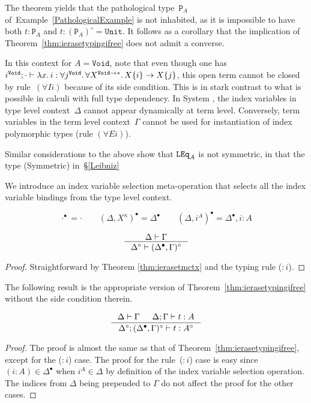 \begin{example}\label{PathologicalExampleContinued}
The theorem yields that the pathological type~$\mathtt P_A$
of~Example~\ref{PathologicalExample} is not inhabited, as it is impossible
to have both $t:\mathtt P_A$ and $t:(\mathtt P_A)^\circ=\mathtt{Unit}$.
It follows as a corollary that the implication of
Theorem~\ref{thm:ierasetypingifree} does not admit a converse.

In this context for $A=\mathtt{Void}$, note that even though one has
$i^\mathtt{Void};\cdot\vdash\lambda x.\,i:\forall
j^{\mathtt{Void}}.\,\forall X^{\mathtt{Void}\to*}.\, X\{i\}\to X\{j\}$, 
this open term %
cannot be closed by rule~$(\forall Ii)$ because of its side
condition.  This is in stark contrast to what is possible in calculi with
full type dependency. In System \Fi, the index variables
in type level context~$\Delta$ cannot appear dynamically at term level.
Conversely, term variables in the term level context~$\Gamma$ cannot be
used for instantiation of index polymorphic types (rule $(\forall Ei)$).

Similar considerations to the above show that $\mathtt{LEq}_A$ is not symmetric,
in that the type {\small\rm(Symmetric)} in~\S\ref{Leibniz}
\end{example}

We introduce an index variable selection meta-operation that selects all
the index variable bindings from the type level context.

\begin{definition}
\[ \cdot^\bullet = \cdot \qquad
	(\Delta,X^\kappa)^\bullet = \Delta^\bullet \qquad
	(\Delta,i^A)^\bullet = \Delta^\bullet,i:A
\]
\end{definition}

\begin{theorem}
\label{thm:ierasetmctxivs}
\[ \inference{\Delta |- \Gamma}{\Delta^\circ |- (\Delta^\bullet,\Gamma)^\circ}
\]
\end{theorem}
\begin{proof}
Straightforward by Theorem \ref{thm:ierasetmctx} and the typing rule ($:i$).
\end{proof}

The following result is the appropriate version of
Theorem~\ref{thm:ierasetypingifree} without the side condition therein.

\begin{theorem}
\label{thm:ierasetypingall}
\[ \inference{\Delta |- \Gamma & \Delta;\Gamma |- t : A}
		{\Delta^\circ;(\Delta^\bullet,\Gamma)^\circ |- t : A^\circ}
\]
\end{theorem}
\begin{proof}
	The proof is almost the same as that of
	Theorem~\ref{thm:ierasetypingifree}, except for the ($:i$) case.
	The proof for the rule~($:i$) case is easy
	since $(i:A) \in \Delta^\bullet$ when $i^A \in \Delta$ by definition of
	the index variable selection operation. The indices from $\Delta$
	being prepended to $\Gamma$ do not affect the proof for the other cases.
\end{proof}

